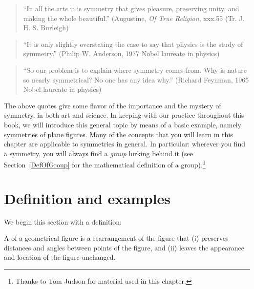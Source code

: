 


\begin{quote}
``In all the arts it is symmetry that gives pleasure, preserving unity, and making the whole beautiful.'' (Augustine, \emph{Of True Religion}, xxx.55 (Tr. J. H. S. Burleigh)
\end{quote}
\begin{quote}
``It is only slightly overstating the case to say that physics is the study of symmetry.'' (Philip W. Anderson, 1977 Nobel laureate in physics)
\end{quote}
\begin{quote}
``So our problem is to explain where symmetry comes from. Why is nature so nearly symmetrical? No one has any idea why.'' (Richard Feynman, 1965 Nobel laureate in physics)
\end{quote}

The above quotes give some flavor of the importance and the mystery of symmetry, in both art and science. In keeping with our practice throughout this book, we will introduce this general topic by means of a basic example, namely symmetries of plane figures. Many of the concepts that you will learn in this chapter are applicable to symmetries in general. In particular: wherever you find a symmetry, you will always find a \emph{group} lurking behind it (see Section~\ref{DefOfGroup} for the mathematical definition of a group).\footnote{Thanks to Tom Judson for material used in this chapter.}


\section{Definition and examples}

We begin this section with a definition:

\begin{defn} A  of a geometrical figure is a rearrangement of the figure that (i) preserves distances and angles between points of the figure,
 and (ii) leaves the appearance and location of the figure unchanged.
\end{defn}

